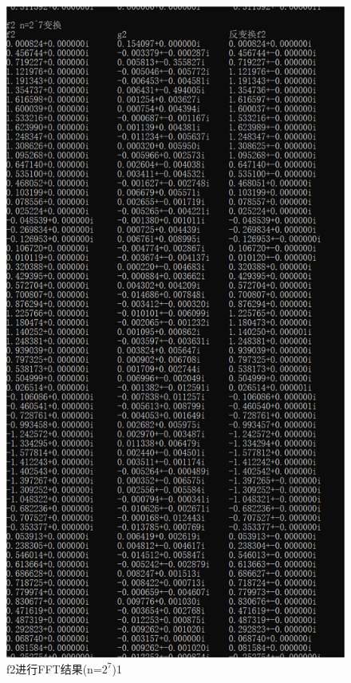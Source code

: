 \documentclass{article}
\begin{document}
\begin{figure}[!h]
	
	\centering
	\includegraphics[scale=0.4]{f2}
	\caption{\heiti{}f2进行FFT结果(n=$ 2^7 $)1}
	\label{fig:5}
\end{figure}
\end{document}
